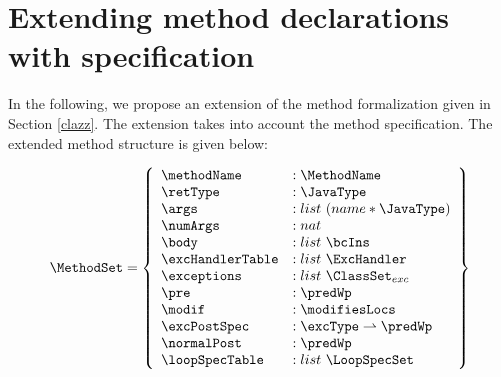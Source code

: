 \section{Extending method declarations with specification}\label{methExtend}

In the following, we propose an extension of the method formalization given in Section \ref{clazz}.
 The extension takes into account the method specification. The extended method structure is given below:

$$ \begin{array}{l} %
                     \MethodSet  = \left\{\begin{array}{ll}  
                                                          \methodName & :\MethodName\\
						          \retType & :\JavaType\\
							  \args &  : list \ (name * \JavaType) \\
							  \numArgs & : nat \\
							  \body &  : list \  \bcIns \\
							  \excHandlerTable & : list \ \ExcHandler  \\
							  \exceptions &  : list \ \ClassSet_{exc}\\
							  \pre & : \predWp \\
							  \modif & :   \modifiesLocs \\ 
							  \excPostSpec & : \excType \rightharpoonup \predWp \\
							  \normalPost & : \predWp \\
                                                          \loopSpecTable & : list \ \LoopSpecSet 
							  
                                     \end{array}  \right\} 
     \end{array} $$

